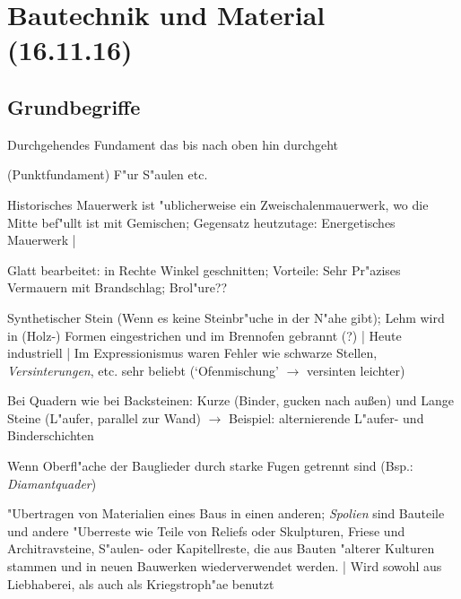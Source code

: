\documentclass[emulatestandardclasses]{scrartcl}
\begin{document}
\section{Bautechnik und Material\\(16.11.16)}

\subsection{Grundbegriffe}

\begin{description}[leftmargin=!,labelwidth=\widthof{\bfseries Streifenfundament}]
  \item[Streifenfundament] Durchgehendes Fundament das bis nach oben hin durchgeht
  \item[Einzelfundament] (Punktfundament) F"ur S"aulen etc.
  \item[Mauerwerk] Historisches Mauerwerk ist "ublicherweise ein Zweischalenmauerwerk, wo die Mitte bef"ullt ist mit Gemischen; Gegensatz heutzutage: Energetisches Mauerwerk | 
  \item[Quader] Glatt bearbeitet: in Rechte Winkel geschnitten; Vorteile: Sehr Pr"azises Vermauern mit Brandschlag; Brol"ure??
  \item[Backstein] Synthetischer Stein (Wenn es keine Steinbr"uche in der N"ahe gibt); Lehm wird in (Holz-) Formen eingestrichen und im Brennofen gebrannt (?) | Heute industriell | Im Expressionismus waren Fehler wie schwarze Stellen, \emph{Versinterungen}, etc. sehr beliebt (`Ofenmischung' $\rightarrow$ versinten leichter)
  \item[Binder \& L"aufer] Bei Quadern wie bei Backsteinen: Kurze (Binder, gucken nach au\ss en) und Lange Steine (L"aufer, parallel zur Wand) $\rightarrow$ Beispiel: alternierende L"aufer- und Binderschichten
  \item[Rustizierung] Wenn Oberfl"ache der Bauglieder durch starke Fugen getrennt sind (Bsp.: \emph{Diamantquader})
  \item[Spoliation] "Ubertragen von Materialien eines Baus in einen anderen; \emph{Spolien} sind Bauteile und andere "Uberreste wie Teile von Reliefs oder Skulpturen, Friese und Architravsteine, S"aulen- oder Kapitellreste, die aus Bauten "alterer Kulturen stammen und in neuen Bauwerken wiederverwendet werden. | Wird sowohl aus Liebhaberei, als auch als Kriegstroph"ae benutzt
  \item[Standger"ust]
  \item[Fliegendes Ger"ust]
  \item[Ger"ustloch]

\end{description}
\end{document}
